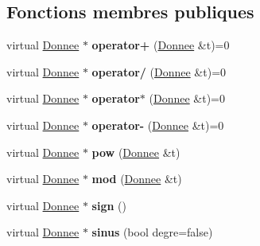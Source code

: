 \subsection*{Fonctions membres publiques}
\begin{DoxyCompactItemize}
\item 
\hypertarget{class_donnee_ad5d08758184849a5b935c897eb950c61}{virtual \hyperlink{class_donnee}{Donnee} $\ast$ {\bfseries operator+} (\hyperlink{class_donnee}{Donnee} \&t)=0}\label{class_donnee_ad5d08758184849a5b935c897eb950c61}

\item 
\hypertarget{class_donnee_ad87f5946973ae658c3f182074fe88c5c}{virtual \hyperlink{class_donnee}{Donnee} $\ast$ {\bfseries operator/} (\hyperlink{class_donnee}{Donnee} \&t)=0}\label{class_donnee_ad87f5946973ae658c3f182074fe88c5c}

\item 
\hypertarget{class_donnee_a3af8060fd9f5523dd06b9024dbf195fd}{virtual \hyperlink{class_donnee}{Donnee} $\ast$ {\bfseries operator$\ast$} (\hyperlink{class_donnee}{Donnee} \&t)=0}\label{class_donnee_a3af8060fd9f5523dd06b9024dbf195fd}

\item 
\hypertarget{class_donnee_ab6d0c4a0e70f03aa17cab93d947574a5}{virtual \hyperlink{class_donnee}{Donnee} $\ast$ {\bfseries operator-\/} (\hyperlink{class_donnee}{Donnee} \&t)=0}\label{class_donnee_ab6d0c4a0e70f03aa17cab93d947574a5}

\item 
\hypertarget{class_donnee_a9637072de31f20b86ca551ac6285487b}{virtual \hyperlink{class_donnee}{Donnee} $\ast$ {\bfseries pow} (\hyperlink{class_donnee}{Donnee} \&t)}\label{class_donnee_a9637072de31f20b86ca551ac6285487b}

\item 
\hypertarget{class_donnee_a7195768b00b91ec0c59c7b958e688a76}{virtual \hyperlink{class_donnee}{Donnee} $\ast$ {\bfseries mod} (\hyperlink{class_donnee}{Donnee} \&t)}\label{class_donnee_a7195768b00b91ec0c59c7b958e688a76}

\item 
\hypertarget{class_donnee_a8376bc550884afe8707bfd0b96566c9a}{virtual \hyperlink{class_donnee}{Donnee} $\ast$ {\bfseries sign} ()}\label{class_donnee_a8376bc550884afe8707bfd0b96566c9a}

\item 
\hypertarget{class_donnee_ac451ff3716c39aab474758ef60842efd}{virtual \hyperlink{class_donnee}{Donnee} $\ast$ {\bfseries sinus} (bool degre=false)}\label{class_donnee_ac451ff3716c39aab474758ef60842efd}


\end{DoxyCompactItemize}
